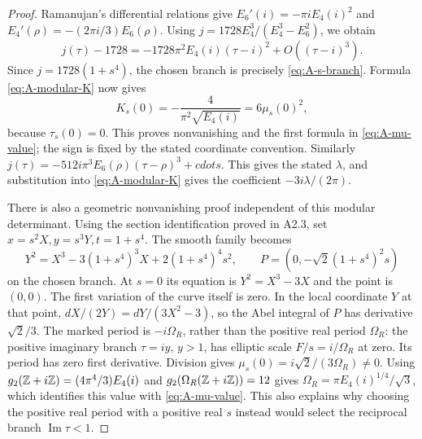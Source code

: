 \begin{proof}
Ramanujan's differential relations give
$E_6'(i)=-\pi i E_4(i)^2$ and
$E_4'(\rho)=-(2\pi i/3)E_6(\rho)$.
Using $j=1728E_4^3/(E_4^3-E_6^2)$, we obtain
\[
j(\tau)-1728=-1728\pi^2E_4(i)(\tau-i)^2+O((\tau-i)^3).
\]
Since $j=1728(1+s^4)$, the chosen branch is precisely
\eqref{eq:A-s-branch}.  Formula \eqref{eq:A-modular-K} now gives
\[
K_s(0)=-\frac4{\pi^2\sqrt{E_4(i)}}=6\mu_s(0)^2,
\]
because $\tau_s(0)=0$.  This proves nonvanishing and the first
formula in \eqref{eq:A-mu-value}; the sign is fixed by the stated
coordinate convention.  Similarly
$j(\tau)=-512i\pi^3E_6(\rho)(\tau-\rho)^3+cdots$.
This gives the stated $\lambda$, and substitution into
\eqref{eq:A-modular-K} gives the coefficient $-3i\lambda/(2\pi)$.

There is also a geometric nonvanishing proof independent of this
modular determinant.  Using the section identification proved in
A2.3, set $x=s^2X,y=s^3Y,t=1+s^4$.  The smooth family becomes
\[
Y^2=X^3-3(1+s^4)^3X+2(1+s^4)^4s^2,
\qquad P=(0,-\sqrt2(1+s^4)^2s)
\]
on the chosen branch.  At $s=0$ its equation is
$Y^2=X^3-3X$ and the point is $(0,0)$.  The first variation of the
curve itself is zero.  In the local coordinate $Y$ at that point,
$dX/(2Y)=dY/(3X^2-3)$, so the Abel integral of $P$ has derivative
$\sqrt2/3$.  The marked period is $-i\Omega_R$, rather than the
positive real period $\Omega_R$: the positive imaginary branch
$\tau=iy$, $y>1$, has elliptic scale $F/s=i/\Omega_R$ at zero.
Its period has zero first derivative.  Division gives
$\mu_s(0)=i\sqrt2/(3\Omega_R)\ne0$.
Using $g_2(\mathbb Z+i\mathbb Z)=(4\pi^4/3)E_4(i)$ and
$g_2(\Omega_R(\mathbb Z+i\mathbb Z))=12$ gives
$\Omega_R=\pi E_4(i)^{1/4}/\sqrt3$, which identifies this value
with \eqref{eq:A-mu-value}.  This also explains why choosing the
positive real period with a positive real $s$ instead would select
the reciprocal branch $\operatorname{Im}\tau<1$.


\end{proof}
